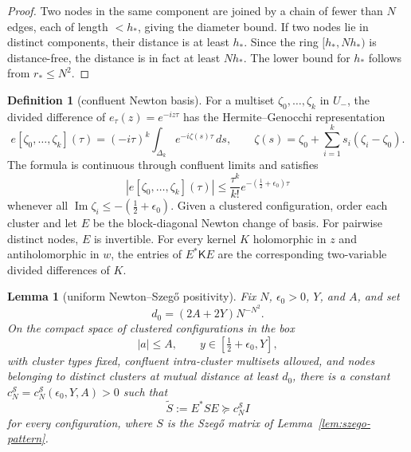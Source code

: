 \documentclass[11pt]{amsart}
\newtheorem{lemma}[theorem]{Lemma}
\theoremstyle{definition}
\newtheorem{definition}[theorem]{Definition}
\theoremstyle{remark}
\theoremstyle{definition}
\renewcommand{\Im}{\operatorname{Im}}
\newcommand{\half}{\tfrac{1}{2}}
\begin{document}
\begin{proof}
Two nodes in the same component are joined by a chain of fewer than $N$ edges, each of length $<h_*$,
giving the diameter bound.  If two nodes lie in distinct components, their distance is at least
$h_*$.  Since the ring $[h_*,Nh_*)$ is distance-free, the distance is in fact at least $Nh_*$.  The
lower bound for $h_*$ follows from $r_*\le N^2$.
\end{proof}

\begin{definition}[confluent Newton basis]\label{def:newton-basis}
For a multiset $\zeta_0,\ldots,\zeta_k$ in $U_-$, the divided difference of
$e_\tau(z)=e^{-iz\tau}$ has the Hermite--Genocchi representation
\[
   e[\zeta_0,\ldots,\zeta_k](\tau)
   =
   (-i\tau)^k
   \int_{\Delta_k}e^{-i\zeta(s)\tau}\,ds,
   \qquad
   \zeta(s)=\zeta_0+\sum_{i=1}^k s_i(\zeta_i-\zeta_0).
\]
The formula is continuous through confluent limits and satisfies
\[
   |e[\zeta_0,\ldots,\zeta_k](\tau)|
   \le
   \frac{\tau^k}{k!}e^{-(\half+\epsilon_0)\tau}
\]
whenever all $\Im\zeta_i\le-(\half+\epsilon_0)$.  Given a clustered configuration, order each cluster
and let $E$ be the block-diagonal Newton change of basis.  For pairwise distinct nodes, $E$ is
invertible.  For every kernel $K$ holomorphic in $z$ and antiholomorphic in $w$, the entries of
$E^*\mathsf K E$ are the corresponding two-variable divided differences of $K$.
\end{definition}

\begin{lemma}[uniform Newton--Szeg\H{o} positivity]\label{lem:newton-szego}
Fix $N$, $\epsilon_0>0$, $Y$, and $A$, and set
\[
   d_0=(2A+2Y)N^{-N^2}.
\]
On the compact space of clustered configurations in the box
\[
   |a|\le A,\qquad y\in[\half+\epsilon_0,Y],
\]
with cluster types fixed, confluent intra-cluster multisets allowed, and nodes belonging to distinct
clusters at mutual distance at least $d_0$, there is a constant
$c_N^{\mathcal S}=c_N^{\mathcal S}(\epsilon_0,Y,A)>0$ such that
\[
   \widetilde S:=E^*SE\succeq c_N^{\mathcal S}I
\]
for every configuration, where $S$ is the Szeg\H{o} matrix of Lemma~\ref{lem:szego-pattern}.
\end{lemma}
\end{document}
